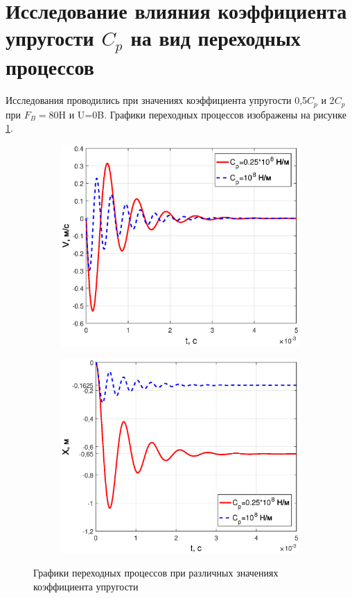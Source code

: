 \documentclass[12pt,a4paper]{article}
\begin{document}
\section{Исследование влияния коэффициента упругости $C_p$ на вид переходных процессов}
Исследования проводились при значениях коэффициента упругости 0,5$C_p$ и 2$C_p$ при $F_B=80$H и U=0B. Графики переходных процессов изображены на рисунке \ref{VX3}.
\begin{figure}[H]
	\centering
	\begin{subfigure}[b]{0.48\textwidth}
	    \includegraphics[width = \textwidth]{V3}
	\end{subfigure}
	\hfill
	\begin{subfigure}[b]{0.48\textwidth}
		\includegraphics[width = \textwidth]{X3}
	\end{subfigure}
	\caption{Графики переходных процессов при различных значениях коэффициента упругости}
	\label{VX3}
\end{figure}
\end{document}
